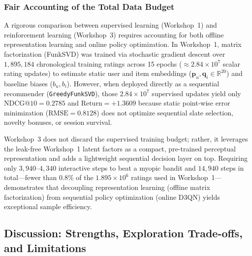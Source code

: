 \subsubsection{Fair Accounting of the Total Data Budget}
A rigorous comparison between supervised learning (Workshop~1) and reinforcement learning (Workshop~3) requires accounting for both offline representation learning and online policy optimization. In Workshop~1, matrix factorization (FunkSVD) was trained via stochastic gradient descent over $1,895,184$ chronological training ratings across 15 epochs ($\approx 2.84 \times 10^7$ scalar rating updates) to estimate static user and item embeddings ($\mathbf{p}_u, \mathbf{q}_i \in \mathbb{R}^{20}$) and baseline biases ($b_u, b_i$). However, when deployed directly as a sequential recommender (\texttt{GreedyFunkSVD}), those $2.84 \times 10^7$ supervised updates yield only $\text{NDCG@10} = 0.2785$ and $\text{Return} = +1.3609$ because static point-wise error minimization ($\text{RMSE} = 0.8128$) does not optimize sequential slate selection, novelty bonuses, or session survival.

Workshop~3 does not discard the supervised training budget; rather, it leverages the leak-free Workshop~1 latent factors as a compact, pre-trained perceptual representation and adds a lightweight sequential decision layer on top. Requiring only $3,940$--$4,340$ interactive steps to beat a myopic bandit and $14,940$ steps in total---fewer than $0.8\%$ of the $1.895 \times 10^6$ ratings used in Workshop~1---demonstrates that decoupling representation learning (offline matrix factorization) from sequential policy optimization (online D3QN) yields exceptional sample efficiency.

\subsection{Discussion: Strengths, Exploration Trade-offs, and Limitations}
\label{subsec:discussion_limitations}

